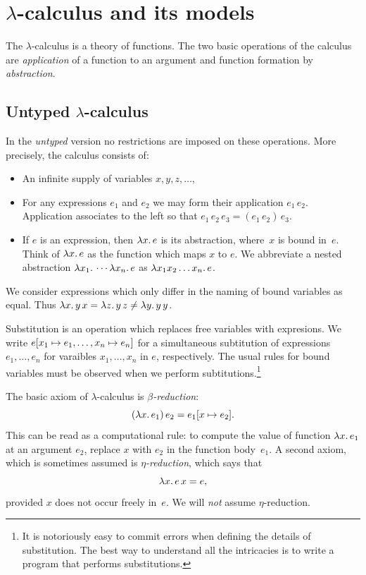 \section{$\lambda$-calculus and its models}
\label{sec:lambda-calculus}

The $\lambda$-calculus is a theory of functions. The two basic
operations of the calculus are \emph{application} of a function to an
argument and function formation by \emph{abstraction}.

\subsection{Untyped $\lambda$-calculus}
\label{sec:untyped-lambda-calculus}

In the \emph{untyped} version no restrictions are imposed on these
operations. More precisely, the calculus consists of:
%
\begin{itemize}
\item An infinite supply of variables $x, y, z, \ldots$,
\item For any expressions $e_1$ and $e_2$ we may form their
  application $e_1\, e_2$. Application associates to the left so that
  $e_1\, e_2\, e_3 = (e_1\, e_2)\, e_3$.
\item If $e$ is an expression, then $\lambda x .\,e$ is its abstraction,
  where~$x$ is bound in~$e$. Think of $\lambda x .\,e$ as the function
  which maps $x$ to $e$. We abbreviate a nested abstraction
  $\lambda x_1 .\,\cdots \lambda x_n .\,e$ as $\lambda x_1 x_2 \ldots x_n .\,e$.
\end{itemize}
%
We consider expressions which only differ in the naming of bound
variables as equal. Thus $\lambda x .\,y\, x = \lambda z .\,y\, z \neq
\lambda y .\,y\, y$.

Substitution is an operation which replaces free variables with
expresions. We write $e[x_1 \mapsto e_1, \ldots, x_n \mapsto
  e_n]$ for a simultaneous subtitution of expressions $e_1, \ldots,
e_n$ for varaibles $x_1, \ldots, x_n$ in $e$, respectively. The usual
rules for bound variables must be observed when we perform
subtitutions.\footnote{It is notoriously easy to commit errors when
  defining the details of substitution. The best way to understand all
  the intricacies is to write a program that performs substitutions.}

The basic axiom of $\lambda$-calculus is \emph{$\beta$-reduction}:
%
\begin{equation*}
  (\lambda x .\,e_1)\, e_2 = e_1[x \mapsto e_2].
\end{equation*}
%
This can be read as a computational rule: to compute the value of
function $\lambda x .\,e_1$ at an argument $e_2$, replace $x$ with $e_2$
in the function body~$e_1$. A second axiom, which is sometimes assumed
is \emph{$\eta$-reduction}, which says that
%
\begin{equation*}
  \lambda x .\,e\, x = e,
\end{equation*}
%
provided $x$ does not occur freely in~$e$. We will \emph{not} assume
$\eta$-reduction.


